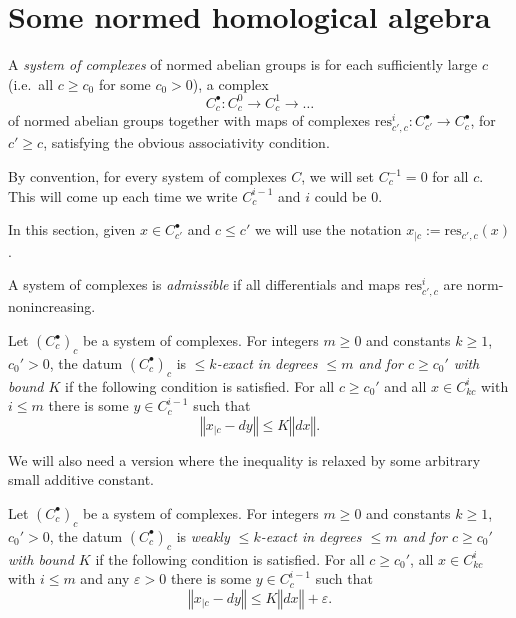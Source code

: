 \section{Some normed homological algebra}%
\label{sec:some_normed_homological_algebra}


\begin{definition}
  \label{system_of_complexes}
  \leanok
  A \emph{system of complexes} of normed abelian groups
  is for each sufficiently large $c$ (i.e.~all $c\geq c_0$ for some $c_0>0$),
  a complex
  \[
  C_c^\bullet: C_c^0\to C_c^1\to\ldots
  \]
  of normed abelian groups together with maps of complexes
  $\mathrm{res}_{c',c}^i: C_{c'}^\bullet\to C_c^\bullet$,
  for $c' ≥ c$,
  satisfying the obvious associativity condition.
\end{definition}

By convention, for every system of complexes $C$, we will set $C^{-1}_c = 0$ for all $c$.
This will come up each time we write $C^{i-1}_c$ and $i$ could be $0$.

In this section, given $x ∈ C^•_{c'}$ and $c ≤ c'$ we will use the notation
$x_{|c} := \mathrm{res}_{c', c}(x)$.

\begin{definition}
  \label{admissible}
  \leanok
  A system of complexes is \emph{admissible}
  if all differentials and maps $\mathrm{res}_{c',c}^i$ are norm-nonincreasing.
\end{definition}

\begin{definition}
  \label{is_bdd_exact_for_bdd_degree_above_idx}
  \leanok
  Let $(C_c^\bullet)_c$ be a system of complexes.
  For integers $m\geq 0$ and constants $k \ge 1$, $c_0'>0$,
  the datum $(C_c^\bullet)_c$ is
  \emph{$\leq k$-exact in degrees $\leq m$ and for $c\geq c_0'$ with bound $K$} if the following condition is satisfied.
  For all $c\geq c_0'$ and all $x\in C_{kc}^i$ with $i\leq m$
  there is some $y\in C_c^{i-1}$ such that
  \[
    ‖x_{|c} - dy‖ ≤ K ‖dx‖.
  \]
\end{definition}

We will also need a version where the inequality is relaxed by some arbitrary small additive constant.

\begin{definition}
  \label{is_weak_bdd_exact_for_bdd_degree_above_idx}
  \leanok
  Let $(C_c^\bullet)_c$ be a system of complexes.
  For integers $m\geq 0$ and constants $k \ge 1$, $c_0'>0$,
  the datum $(C_c^\bullet)_c$ is
  \emph{weakly $\leq k$-exact in degrees $\leq m$ and for $c\geq c_0'$ with bound $K$} if the following condition is satisfied.
  For all $c\geq c_0'$, all $x\in C_{kc}^i$ with $i\leq m$ and any $ε > 0$
  there is some $y\in C_c^{i-1}$ such that
  \[
    ‖x_{|c} - dy‖ ≤ K ‖dx‖ + ε.
  \]
\end{definition}

